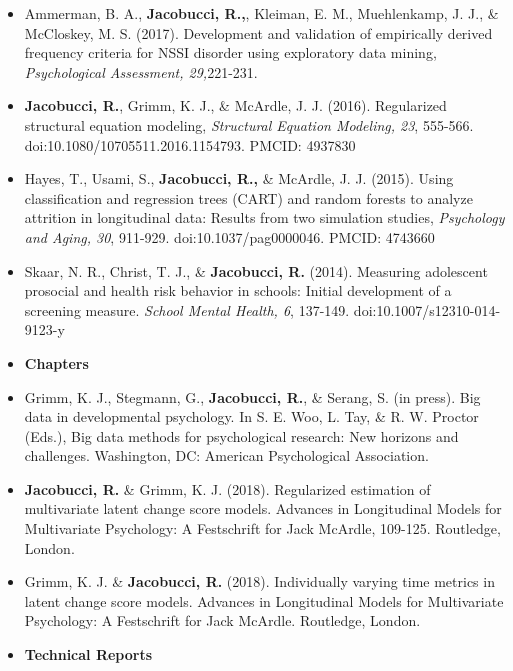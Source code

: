 \documentclass[letterpaper,10pt]{article}
\begin{document}
\begin{itemize}
%
\item[]Ammerman, B. A., \textbf{Jacobucci, R.,}, Kleiman, E. M., Muehlenkamp, J. J., \& McCloskey, M. S. (2017). Development and validation of empirically derived frequency criteria for NSSI disorder using exploratory data mining, \emph{Psychological Assessment, 29,}221-231.
%
\item[]\textbf{Jacobucci, R.}, Grimm, K. J., \& McArdle, J. J. (2016). Regularized structural equation modeling, \emph{Structural Equation Modeling, 23}, 555-566. doi:10.1080/10705511.2016.1154793. PMCID: 4937830
%
%
%
\item[]Hayes, T., Usami, S., \textbf{Jacobucci, R.,} \& McArdle, J. J. (2015). Using classification and regression trees (CART) and random forests to analyze attrition in longitudinal data: Results from two simulation studies, \emph{Psychology and Aging, 30}, 911-929. doi:10.1037/pag0000046. PMCID: 4743660
%
\item[]Skaar, N. R., Christ, T. J., \& \textbf{Jacobucci, R.} (2014). Measuring adolescent prosocial and health risk behavior in schools: Initial development of a screening measure. \emph{School Mental Health, 6}, 137-149. doi:10.1007/s12310-014-9123-y
%
\vspace{3mm}
%
%
%
\item {\textbf{\large{Chapters}}}
\item[]Grimm, K. J., Stegmann, G., \textbf{Jacobucci, R.}, \& Serang, S. (in press). Big data in developmental psychology. In S. E. Woo, L. Tay, \& R. W. Proctor (Eds.), Big data methods for psychological research: New horizons and challenges. Washington, DC: American Psychological Association.
%
\item[] \textbf{Jacobucci, R.} \& Grimm, K. J. (2018). Regularized estimation of multivariate latent change score models. Advances in Longitudinal Models for Multivariate Psychology: A Festschrift for Jack McArdle, 109-125. Routledge, London.
%
\item[] Grimm, K. J. \& \textbf{Jacobucci, R.} (2018). Individually varying time metrics in latent change score models. Advances in Longitudinal Models for Multivariate Psychology: A Festschrift for Jack McArdle. Routledge, London.
%
%
\vspace{3mm}
%
\item {\textbf{\large{Technical Reports}}}

\end{itemize}
\end{document}
